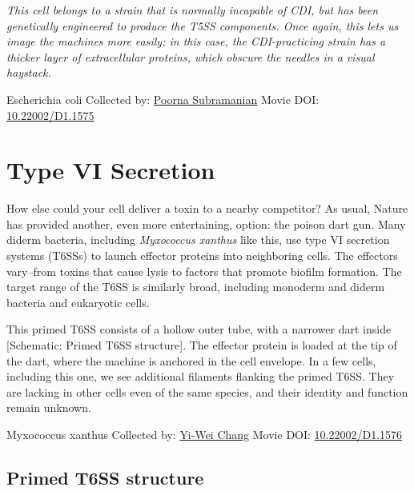 \documentclass[]{tufte-book}
\begin{document}
\emph{This cell belongs to a strain that is normally incapable of CDI, but has been genetically engineered to produce the T5SS components. Once again, this lets us image the machines more easily; in this case, the CDI-practicing strain has a thicker layer of extracellular proteins, which obscure the needles in a visual haystack.}



\hypertarget{htmlwidget-110eb900a41ea6847c03}{}

\label{fig:9-5}Escherichia coli Collected by: \protect\hyperlink{poorna_subramanian}{Poorna Subramanian} Movie DOI: \href{https://doi.org/10.22002/D1.1575}{10.22002/D1.1575}

\hypertarget{type-vi-secretion}{%
\section{Type VI Secretion}\label{type-vi-secretion}}

How else could your cell deliver a toxin to a nearby competitor? As usual, Nature has provided another, even more entertaining, option: the poison dart gun. Many diderm bacteria, including \emph{Myxococcus xanthus} like this, use type VI secretion systems (T6SSs) to launch effector proteins into neighboring cells. The effectors vary--from toxins that cause lysis to factors that promote biofilm formation. The target range of the T6SS is similarly broad, including monoderm and diderm bacteria and eukaryotic cells.

This primed T6SS consists of a hollow outer tube, with a narrower dart inside {[}Schematic: Primed T6SS structure{]}. The effector protein is loaded at the tip of the dart, where the machine is anchored in the cell envelope. In a few cells, including this one, we see additional filaments flanking the primed T6SS. They are lacking in other cells even of the same species, and their identity and function remain unknown.



\hypertarget{htmlwidget-e5d88705a42ad24b79d3}{}

\label{fig:9-6}Myxococcus xanthus Collected by: \protect\hyperlink{yi-wei_chang}{Yi-Wei Chang} Movie DOI: \href{https://doi.org/10.22002/D1.1576}{10.22002/D1.1576}

\hypertarget{Primed_T6SS_structure}{%
\subsection{Primed T6SS structure}\label{Primed_T6SS_structure}}
\end{document}
